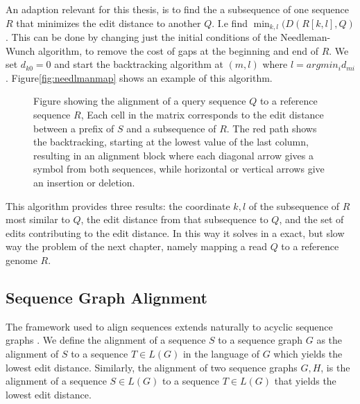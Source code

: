 An adaption relevant for this thesis, is to find the a subsequence of one sequence $R$ that minimizes the edit distance to another $Q$. I.e find $\min_{k, l}(D(R[k, l], Q)$.
This can be done by changing just the initial conditions of the Needleman-Wunch algorithm, to remove the cost of gaps at the beginning and end of $R$. We set $d_{k0} = 0$ and start the backtracking algorithm at $(m, l)$ where $l=arg min_i d_{mi}$. Figure\ref{fig:needlmanmap} shows an example of this algorithm.
\begin{figure}
  \begin{tikzpicture}
    
  \end{tikzpicture}
  \label{fig:needlemanmap}
  \caption{Figure showing the alignment of a query sequence $Q$ to a reference sequence $R$, 
Each cell in the matrix corresponds to the edit distance between a prefix of $S$ and a subsequence of  $R$. The red path shows the backtracking, starting at the lowest value of the last column, resulting in an alignment block where each diagonal arrow gives a symbol from both sequences, while horizontal or vertical arrows give an insertion or deletion.}
\end{figure}
This algorithm provides three results: the coordinate $k, l$ of the subsequence of $R$ most similar to $Q$, the edit distance from that subsequence to $Q$, and the set of edits contributing to the edit distance. In this way it solves in a exact, but slow way the problem of the next chapter, namely mapping a read $Q$ to a reference genome $R$.

\subsection{Sequence Graph Alignment}
The framework used to align sequences extends naturally to acyclic sequence graphs \cite{hein, poa}. We define the alignment of a sequence $S$ to a sequence graph $G$ as the alignment of $S$ to a sequence $T \in L(G)$ in the language of $G$  which yields the lowest edit distance.
Similarly, the alignment of two sequence graphs $G, H$, is the alignment of a sequence $S \in L(G)$ to a sequence $T \in L(G)$ that yields the lowest edit distance. 

